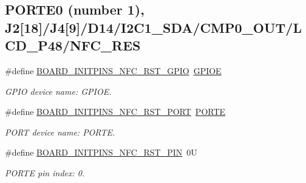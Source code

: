 \subsection*{P\+O\+R\+T\+E0 (number 1), J2\mbox{[}18\mbox{]}/\+J4\mbox{[}9\mbox{]}/\+D14/\+I2\+C1\+\_\+\+S\+D\+A/\+C\+M\+P0\+\_\+\+O\+U\+T/\+L\+C\+D\+\_\+\+P48/\+N\+F\+C\+\_\+\+R\+ES}
\begin{DoxyCompactItemize}
\item 
\mbox{\label{group__pin__mux_ga8845fa514836032366cb279f04bb5bf0}} 
\#define \mbox{\hyperlink{group__pin__mux_ga8845fa514836032366cb279f04bb5bf0}{B\+O\+A\+R\+D\+\_\+\+I\+N\+I\+T\+P\+I\+N\+S\+\_\+\+N\+F\+C\+\_\+\+R\+S\+T\+\_\+\+G\+P\+IO}}~\mbox{\hyperlink{group___g_p_i_o___peripheral___access___layer_gae04bdb5e8acc47cab1d0532e6b0d0763}{G\+P\+I\+OE}}
\begin{DoxyCompactList}\small\item\em G\+P\+IO device name\+: G\+P\+I\+OE. \end{DoxyCompactList}\item 
\mbox{\label{group__pin__mux_ga806eee834220460e80e71cd0c8ae3d83}} 
\#define \mbox{\hyperlink{group__pin__mux_ga806eee834220460e80e71cd0c8ae3d83}{B\+O\+A\+R\+D\+\_\+\+I\+N\+I\+T\+P\+I\+N\+S\+\_\+\+N\+F\+C\+\_\+\+R\+S\+T\+\_\+\+P\+O\+RT}}~\mbox{\hyperlink{group___p_o_r_t___peripheral___access___layer_ga7e2386d3b1084b5b875ae3696f550ba9}{P\+O\+R\+TE}}
\begin{DoxyCompactList}\small\item\em P\+O\+RT device name\+: P\+O\+R\+TE. \end{DoxyCompactList}\item 
\mbox{\label{group__pin__mux_gadf86cad11048623d7512bf2f560164c2}} 
\#define \mbox{\hyperlink{group__pin__mux_gadf86cad11048623d7512bf2f560164c2}{B\+O\+A\+R\+D\+\_\+\+I\+N\+I\+T\+P\+I\+N\+S\+\_\+\+N\+F\+C\+\_\+\+R\+S\+T\+\_\+\+P\+IN}}~0U
\begin{DoxyCompactList}\small\item\em P\+O\+R\+TE pin index\+: 0. \end{DoxyCompactList}\end{DoxyCompactItemize}
